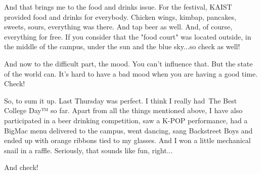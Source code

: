 \begin{post}
\begin{content}
And that brings me to the food and drinks issue. For the festival, KAIST provided food and drinks for everybody. Chicken wings, kimbap, pancakes, sweets, sours, everything was there. And tap beer as well. And, of course, everything for free. If you consider that the "food court" was located outside, in the middle of the campus, under the sun and the blue sky...so \textcolor{Chameleon}{check} as well!

And now to the difficult part, the mood. You can't influence that. But the state of the world can. It's hard to have a bad mood when you are having a good time. \textcolor{Chameleon}{Check!}

So, to sum it up. Last Thursday was perfect. I think I really had The Best College Day™ so far. Apart from all the things mentioned above, I have also participated in a beer drinking competition, saw a K-POP performance, had a BigMac menu delivered to the campus, went dancing, sang Backstreet Boys and ended up with orange ribbons tied to my glasses. And I won a little mechanical snail in a raffle. Seriously, that sounds like fun, right...

And \textcolor{Chameleon}{check}!
	\end{content}
\end{post}
